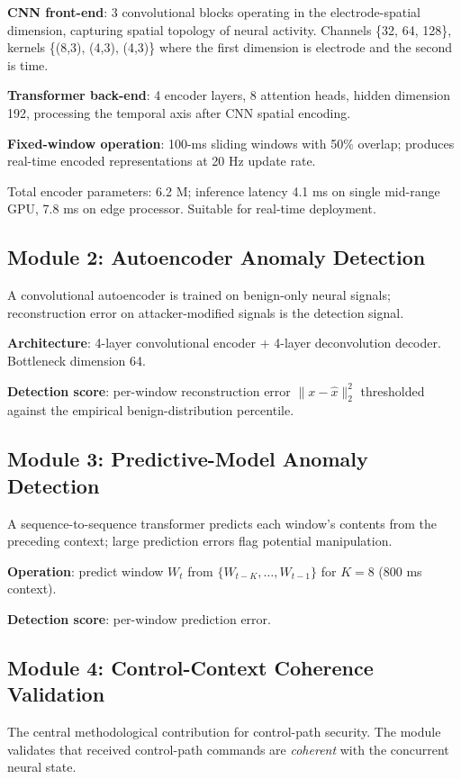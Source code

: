 \documentclass[sigconf,nonacm]{acmart}
\begin{document}
\textbf{CNN front-end}: 3 convolutional blocks operating in the
electrode-spatial dimension, capturing spatial topology of
neural activity. Channels \{32, 64, 128\}, kernels \{(8,3), (4,3),
(4,3)\} where the first dimension is electrode and the second is
time.

\textbf{Transformer back-end}: 4 encoder layers, 8 attention heads,
hidden dimension 192, processing the temporal axis after CNN
spatial encoding.

\textbf{Fixed-window operation}: 100-ms sliding windows with
50\% overlap; produces real-time encoded representations at 20 Hz
update rate.

Total encoder parameters: 6.2 M; inference latency 4.1 ms on
single mid-range GPU, 7.8 ms on edge processor. Suitable for
real-time deployment.

\subsection{Module 2: Autoencoder Anomaly Detection}

A convolutional autoencoder is trained on benign-only neural
signals; reconstruction error on attacker-modified signals is the
detection signal.

\textbf{Architecture}: 4-layer convolutional encoder + 4-layer
deconvolution decoder. Bottleneck dimension 64.

\textbf{Detection score}: per-window reconstruction error
$\|x - \hat{x}\|_2^2$ thresholded against the empirical
benign-distribution percentile.

\subsection{Module 3: Predictive-Model Anomaly Detection}

A sequence-to-sequence transformer predicts each window's contents
from the preceding context; large prediction errors flag potential
manipulation.

\textbf{Operation}: predict window $W_t$ from
$\{W_{t-K}, \ldots, W_{t-1}\}$ for $K = 8$ (800 ms context).

\textbf{Detection score}: per-window prediction error.

\subsection{Module 4: Control-Context Coherence Validation}

The central methodological contribution for control-path security.
The module validates that received control-path commands are
\emph{coherent} with the concurrent neural state.
\end{document}
